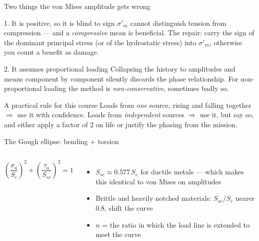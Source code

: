 \documentclass[aspectratio=169,10pt]{beamer}
\begin{document}
\begin{frame}{Two things the von Mises amplitude gets wrong}
\begin{alertblock}{1. It is positive, so it is blind to sign}
$\sigma'_m$ cannot distinguish tension from compression --- and a \emph{compressive} mean is beneficial. The repair: carry the sign of the dominant principal stress (or of the hydrostatic stress) into $\sigma'_m$, otherwise you count a benefit as damage.
\end{alertblock}
\begin{alertblock}{2. It assumes proportional loading}
Collapsing the history to amplitudes and means component by component \alert{silently discards the phase relationship}. For non-proportional loading the method is \emph{non-conservative}, sometimes badly so.
\end{alertblock}
\vspace{2pt}
\begin{block}{A practical rule for this course}
\footnotesize Loads from \emph{one} source, rising and falling together $\Rightarrow$ use it with confidence. Loads from \emph{independent} sources $\Rightarrow$ use it, but say so, and either apply a factor of 2 on life or justify the phasing from the mission.
\end{block}
\end{frame}

\begin{frame}{The Gough ellipse: bending $+$ torsion}
\begin{columns}[T]
\[
\left(\frac{\sigma_a}{S_e}\right)^{2}+\left(\frac{\tau_a}{S_{se}}\right)^{2}=1
\]
\begin{itemize}\footnotesize
  \item $S_{se}\approx0.577\,S_e$ for ductile metals --- which makes this \alert{identical} to von Mises on amplitudes
  \item Brittle and heavily notched materials: $S_{se}/S_e$ nearer 0.8, shift the curve
  \item $n$ = the ratio in which the load line is extended to meet the curve
\end{itemize}
\centering

\end{columns}
\end{frame}
\end{document}
